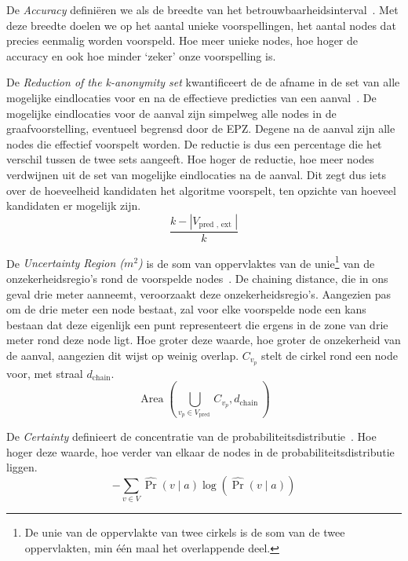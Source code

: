 De \textit{Accuracy} definiëren we als de breedte van het
betrouwbaarheidsinterval~\cite{Dhondt, Verdonck_2022}. Met deze breedte doelen
we op het aantal unieke voorspellingen, het aantal nodes dat precies eenmalig
worden voorspeld. Hoe meer unieke nodes, hoe hoger de accuracy en ook hoe
minder `zeker' onze voorspelling is.

De \textit{Reduction of the k-anonymity set} kwantificeert de de afname in de
set van alle mogelijke eindlocaties voor en na de effectieve predicties van een
aanval~\cite{Dhondt, Verdonck_2022}. De mogelijke eindlocaties voor de aanval
zijn simpelweg alle nodes in de graafvoorstelling, eventueel begrensd door de
\ac{EPZ}. Degene na de aanval zijn alle nodes die effectief voorspelt worden.
De reductie is dus een percentage die het verschil tussen de twee sets
aangeeft. Hoe hoger de reductie, hoe meer nodes verdwijnen uit de set van
mogelijke eindlocaties na de aanval. Dit zegt dus iets over de hoeveelheid
kandidaten het algoritme voorspelt, ten opzichte van hoeveel kandidaten er
mogelijk zijn.
\begin{equation}
    \frac{k-\left|V_{\text {pred }, \text { ext }}\right|}{k}\label{eq:reduction}
\end{equation}

De \textit{Uncertainty Region ($m^2$)} is de som van oppervlaktes van de
unie\footnote{De unie van de oppervlakte van twee cirkels is de som van de twee
    oppervlakten, min één maal het overlappende deel.} van de onzekerheidsregio's
rond de voorspelde nodes~\cite{Dhondt,Verdonck_2022}. De chaining distance, die
in ons geval drie meter aanneemt, veroorzaakt deze onzekerheidsregio's.
Aangezien pas om de drie meter een node bestaat, zal voor elke voorspelde node
een kans bestaan dat deze eigenlijk een punt representeert die ergens in de
zone van drie meter rond deze node ligt. Hoe groter deze waarde, hoe groter de
onzekerheid van de aanval, aangezien dit wijst op weinig overlap. $C_{v_p}$
stelt de cirkel rond een node voor, met straal $d_{\text{chain}}$.
\begin{equation}
    \operatorname{Area}\left(\bigcup_{v_p \in V_{\text {pred }}} C_{v_p}, d_{\text {chain }}\right)\label{eq:uncertainty}
\end{equation}

De \textit{Certainty} definieert de concentratie van de
probabiliteitsdistributie~\cite{Dhondt}. Hoe hoger deze waarde, hoe verder van
elkaar de nodes in de probabiliteitsdistributie liggen.
\begin{equation}
    -\sum_{v \in V} \widehat{\operatorname{Pr}}(v \mid a) \log (\widehat{\operatorname{Pr}}(v \mid a))\label{eq:certainty}
\end{equation}

